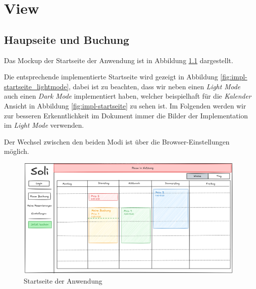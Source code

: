 
\chapter{View}
\label{chap:view}


\section{Haupseite und Buchung}

Das Mockup der Startseite der Anwendung ist in Abbildung \ref{fig:startseite} dargestellt.

Die entsprechende implementierte Startseite wird gezeigt in Abbildung \ref{fig:impl-startseite_lightmode},
dabei ist zu beachten, dass wir neben einen \textit{Light Mode} auch einen \textit{Dark Mode} implementiert haben,
welcher beispielhaft für die \textit{Kalender} Ansicht in Abbildung \ref{fig:impl-startseite} zu sehen ist.
Im Folgenden werden wir zur besseren Erkenntlichkeit im Dokument immer die Bilder der Implementation im \textit{Light Mode}
verwenden.

Der Wechsel zwischen den beiden Modi ist über die Browser-Einstellungen möglich.

\begin{figure}[ht]
    \centering
    \includegraphics[width=\textwidth]{figures/mockup/calendar}
    \caption{Startseite der Anwendung}
    \label{fig:startseite}
\end{figure}
\pagebreak

